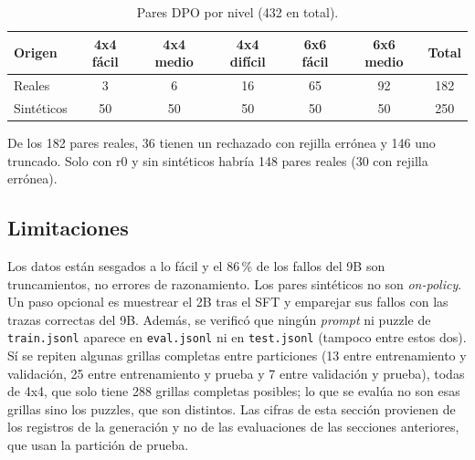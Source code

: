 \begin{table}[htbp]
  \centering\small
  \caption{Pares DPO por nivel (432 en total).}
  \label{tab:traces-dpo}
  \begin{tabular}{@{}lcccccc@{}}
    \toprule
    Origen & 4x4 fácil & 4x4 medio & 4x4 difícil & 6x6 fácil & 6x6 medio & Total \\
    \midrule
    Reales      &  3 &  6 & 16 & 65 & 92 & 182 \\
    Sintéticos  & 50 & 50 & 50 & 50 & 50 & 250 \\
    \bottomrule
  \end{tabular}
\end{table}

De los 182 pares reales, 36 tienen un rechazado con rejilla errónea y 146 uno
truncado. Solo con r0 y sin sintéticos habría 148 pares reales (30 con rejilla
errónea).

\subsection{Limitaciones}
\label{sec:traces-limitaciones}
Los datos están sesgados a lo fácil y el 86\,\% de los fallos del 9B son
truncamientos, no errores de razonamiento. Los pares sintéticos no son
\emph{on-policy}. Un paso opcional es muestrear el 2B tras el SFT y emparejar sus
fallos con las trazas correctas del 9B. Además, se verificó que ningún \emph{prompt} ni puzzle de \texttt{train.jsonl}
aparece en \texttt{eval.jsonl} ni en \texttt{test.jsonl} (tampoco entre estos
dos). Sí se repiten algunas grillas completas entre particiones (13 entre
entrenamiento y validación, 25 entre entrenamiento y prueba y 7 entre
validación y prueba), todas de 4x4, que solo tiene 288 grillas completas
posibles; lo que se evalúa no son esas grillas sino los puzzles, que son
distintos. Las cifras de esta sección provienen de los registros de la
generación y no de las evaluaciones de las secciones anteriores, que usan la
partición de prueba.
